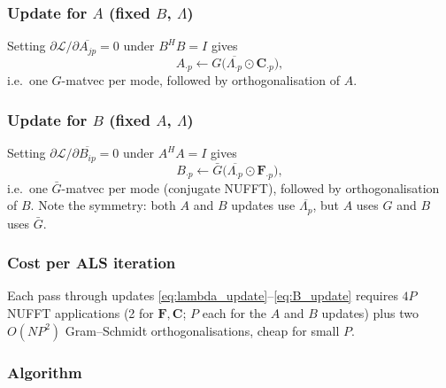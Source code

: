 \documentclass{article}
\begin{document}
\subsubsection*{Update for $A$ (fixed $B$, $\Lambda$)}

Setting $\partial\mathcal{L}/\partial\overline{A_{jp}} = 0$ under $B^H B = I$ gives
\begin{equation}
    A_{\cdot p} \leftarrow G\bigl(\overline{\Lambda_{\cdot p}} \odot \mathbf{C}_{\cdot p}\bigr),
    \label{eq:A_update}
\end{equation}
i.e.\ one $G$-matvec per mode, followed by orthogonalisation of $A$.

\subsubsection*{Update for $B$ (fixed $A$, $\Lambda$)}

Setting $\partial\mathcal{L}/\partial\overline{B_{ip}} = 0$ under $A^H A = I$ gives
\begin{equation}
    B_{\cdot p} \leftarrow \bar{G}\bigl(\overline{\Lambda_{\cdot p}} \odot \mathbf{F}_{\cdot p}\bigr),
    \label{eq:B_update}
\end{equation}
i.e.\ one $\bar{G}$-matvec per mode (conjugate NUFFT), followed by orthogonalisation of $B$.
Note the symmetry: both $A$ and $B$ updates use $\overline{\Lambda_p}$, but $A$ uses $G$ and $B$ uses $\bar{G}$.

\subsubsection*{Cost per ALS iteration}

Each pass through updates \eqref{eq:lambda_update}--\eqref{eq:B_update} requires $4P$ NUFFT
applications (2 for $\mathbf{F},\mathbf{C}$; $P$ each for the $A$ and $B$ updates)
plus two $O(NP^2)$ Gram--Schmidt orthogonalisations, cheap for small $P$.

\subsubsection*{Algorithm}
\end{document}
